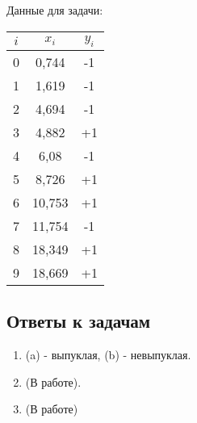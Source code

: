 \begin{enumerate}
          Данные для задачи:
          \begin{table*}[h]
              \centering
              \begin{tabular}{|c|c|c|}
                  \hline
                  $i$ & $x_{i}$ & $y_{i}$                    \\ \hline
                  0   & 0,744   & \cellcolor[HTML]{3166FF}-1 \\ \hline
                  1   & 1,619   & \cellcolor[HTML]{3166FF}-1 \\ \hline
                  2   & 4,694   & \cellcolor[HTML]{3166FF}-1 \\ \hline
                  3   & 4,882   & \cellcolor[HTML]{FE0000}+1 \\ \hline
                  4   & 6,08    & \cellcolor[HTML]{3166FF}-1 \\ \hline
                  5   & 8,726   & \cellcolor[HTML]{FE0000}+1 \\ \hline
                  6   & 10,753  & \cellcolor[HTML]{FE0000}+1 \\ \hline
                  7   & 11,754  & \cellcolor[HTML]{3166FF}-1 \\ \hline
                  8   & 18,349  & \cellcolor[HTML]{FE0000}+1 \\ \hline
                  9   & 18,669  & \cellcolor[HTML]{FE0000}+1 \\ \hline
              \end{tabular}
          \end{table*}
\end{enumerate}

\subsection*{Ответы к задачам}
\begin{enumerate}
    \item (a) - выпуклая, (b) - невыпуклая.
    \item (В работе).
    \item (В работе)
\end{enumerate}
